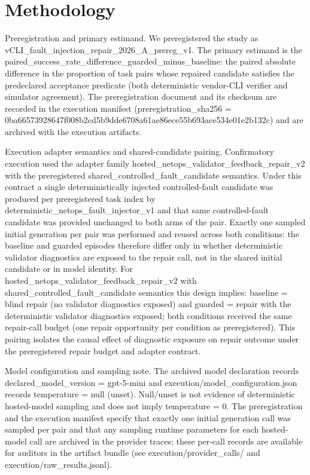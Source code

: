 \documentclass[conference]{IEEEtran}
\begin{document}
\section{Methodology}
Preregistration and primary estimand. We preregistered the study as vCLI\_fault\_injection\_repair\_2026\_A\_prereg\_v1. The primary estimand is the paired\_success\_rate\_difference\_guarded\_minus\_baseline: the paired absolute difference in the proportion of task pairs whose repaired candidate satisfies the predeclared acceptance predicate (both deterministic vendor-CLI verifier and simulator agreement). The preregistration document and its checksum are recorded in the execution manifest (preregistration\_sha256 = 0ba66573\allowbreak{}928647f0\allowbreak{}08b2cd5b\allowbreak{}9dde6708\allowbreak{}a61ae86e\allowbreak{}ce55b693\allowbreak{}ace534e0\allowbreak{}1e2b132c) and are archived with the execution artifacts.

Execution adapter semantics and shared-candidate pairing. Confirmatory execution used the adapter family hosted\_netops\_validator\_feedback\_repair\_v2 with the preregistered shared\_controlled\_fault\_candidate semantics. Under this contract a single deterministically injected controlled-fault candidate was produced per preregistered task index by deterministic\_netops\_fault\_injector\_v1 and that same controlled-fault candidate was provided unchanged to both arms of the pair. Exactly one sampled initial generation per pair was performed and reused across both conditions: the baseline and guarded episodes therefore differ only in whether deterministic validator diagnostics are exposed to the repair call, not in the shared initial candidate or in model identity. For hosted\_netops\_validator\_feedback\_repair\_v2 with shared\_controlled\_fault\_candidate semantics this design implies: baseline = blind repair (no validator diagnostics exposed) and guarded = repair with the deterministic validator diagnostics exposed; both conditions received the same repair-call budget (one repair opportunity per condition as preregistered). This pairing isolates the causal effect of diagnostic exposure on repair outcome under the preregistered repair budget and adapter contract.

Model configuration and sampling note. The archived model declaration records declared\_model\_version = gpt-5-mini and execution/model\_configuration.json records temperature = null (unset). Null/unset is not evidence of deterministic hosted-model sampling and does not imply temperature = 0. The preregistration and the execution manifest specify that exactly one initial generation call was sampled per pair and that any sampling runtime parameters for each hosted-model call are archived in the provider traces; these per-call records are available for auditors in the artifact bundle (see execution/provider\_calls/ and execution/raw\_results.jsonl).
\end{document}
